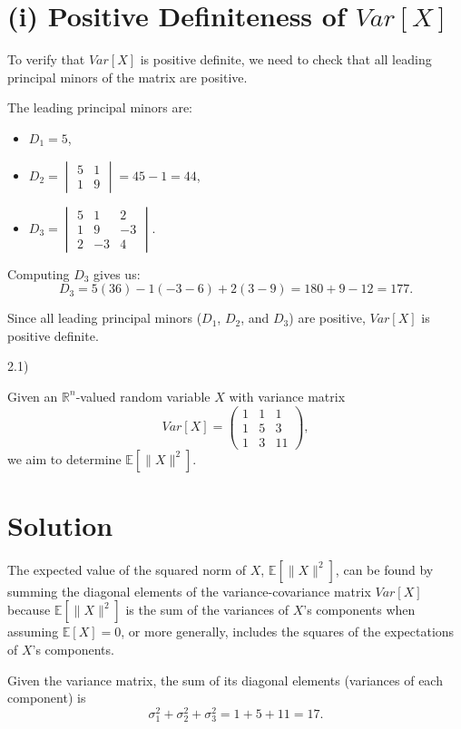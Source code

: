 \documentclass{article}
\begin{document}
\section*{(i) Positive Definiteness of \(Var[X]\)}
To verify that \(Var[X]\) is positive definite, we need to check that all leading principal minors of the matrix are positive.

The leading principal minors are:
\begin{itemize}
    \item \(D_1 = 5\),
    \item \(D_2 = \begin{vmatrix}
5 & 1 \\
1 & 9
\end{vmatrix} = 45 - 1 = 44\),
    \item \(D_3 = \begin{vmatrix}
5 & 1 & 2 \\
1 & 9 & -3 \\
2 & -3 & 4
\end{vmatrix}.\)
\end{itemize}
Computing \(D_3\) gives us:
\[ D_3 = 5(36) - 1(-3 - 6) + 2(3 - 9) = 180 + 9 - 12 = 177. \]

Since all leading principal minors (\(D_1\), \(D_2\), and \(D_3\)) are positive, \(Var[X]\) is positive definite.

2.1)

Given an \(\mathbb{R}^n\)-valued random variable \(X\) with variance matrix
\[ Var[X] = \begin{pmatrix}
1 & 1 & 1 \\
1 & 5 & 3 \\
1 & 3 & 11
\end{pmatrix}, \]
we aim to determine \(\mathbb{E}[\|X\|^2]\).

\section*{Solution}

The expected value of the squared norm of \(X\), \(\mathbb{E}[\|X\|^2]\), can be found by summing the diagonal elements of the variance-covariance matrix \(Var[X]\) because \(\mathbb{E}[\|X\|^2]\) is the sum of the variances of \(X\)'s components when assuming \(\mathbb{E}[X] = 0\), or more generally, includes the squares of the expectations of \(X\)'s components. 

Given the variance matrix, the sum of its diagonal elements (variances of each component) is
\[ \sigma^2_1 + \sigma^2_2 + \sigma^2_3 = 1 + 5 + 11 = 17. \]
\end{document}
